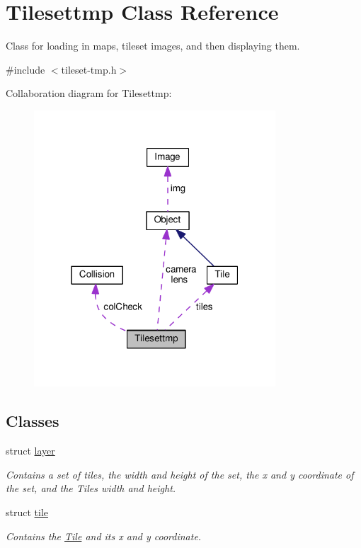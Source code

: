 \hypertarget{classTilesettmp}{}\section{Tilesettmp Class Reference}
\label{classTilesettmp}


Class for loading in maps, tileset images, and then displaying them.  




{\ttfamily \#include $<$tileset-\/tmp.\+h$>$}



Collaboration diagram for Tilesettmp\+:
\nopagebreak
\begin{figure}[H]
\begin{center}
\leavevmode
\includegraphics[width=256pt]{classTilesettmp__coll__graph}
\end{center}
\end{figure}
\subsection*{Classes}
\begin{DoxyCompactItemize}
\item 
struct \hyperlink{structTilesettmp_1_1layer}{layer}
\begin{DoxyCompactList}\small\item\em Contains a set of tiles, the width and height of the set, the x and y coordinate of the set, and the Tiles width and height. \end{DoxyCompactList}\item 
struct \hyperlink{structTilesettmp_1_1tile}{tile}
\begin{DoxyCompactList}\small\item\em Contains the \hyperlink{classTile}{Tile} and its x and y coordinate. \end{DoxyCompactList}\end{DoxyCompactItemize}

